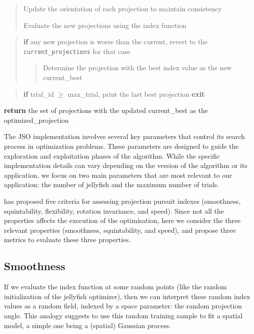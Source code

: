 \documentclass[
  number,
  preprint,
  3p]{elsarticle}
\begin{document}
\begin{tcolorbox}
\begin{quote}
Update the orientation of each projection to maintain consistency

Evaluate the new projections using the index function
\end{quote}

\begin{quote}
\textbf{if} any new projection is worse than the current, revert to the
\texttt{current\_projections} for that case

\begin{quote}
Determine the projection with the best index value as the new
current\_best
\end{quote}
\end{quote}

\begin{quote}
\textbf{if} trial\_id \(\geq\) max\_trial, print the last best
projection \textbf{exit}
\end{quote}

\textbf{return} the set of projections with the updated current\_best as
the optimized\_projection

\end{tcolorbox}

The JSO implementation involves several key parameters that control its
search process in optimization problems. These parameters are designed
to guide the exploration and exploitation phases of the algorithm. While
the specific implementation details can vary depending on the version of
the algorithm or its application, we focus on two main parameters that
are most relevant to our application: the number of jellyfish and the
maximum number of trials.

\citet{laa_using_2020} has proposed five criteria for assessing
projection pursuit indexes (smoothness, squintability, flexibility,
rotation invariance, and speed). Since not all the properties affects
the execution of the optimisation, here we consider the three relevant
properties (smoothness, squintability, and speed), and propose three
metrics to evaluate these three properties.

\subsection{Smoothness}\label{sec-smoothness}

If we evaluate the index function at some random points (like the random
initialization of the jellyfish optimizer), then we can interpret these
random index values as a random field, indexed by a space parameter: the
random projection angle. This analogy suggests to use this random
training sample to fit a spatial model, a simple one being a (spatial)
Gaussian process.
\end{document}
